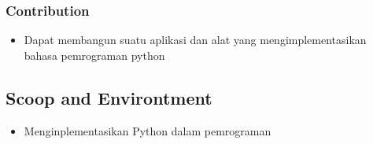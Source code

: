 \subsubsection{Contribution}
\begin{itemize}
	\item Dapat membangun suatu aplikasi dan alat yang mengimplementasikan bahasa pemrograman python
\end{itemize}

\subsection{Scoop and Environtment}
\begin{itemize}
	\item Menginplementasikan Python dalam pemrograman
\end{itemize}